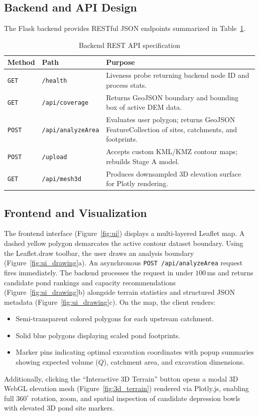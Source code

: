 \documentclass[manuscript,screen,review]{acmart}
\begin{document}
\subsection{Backend and API Design}
The Flask backend provides RESTful JSON endpoints summarized in Table~\ref{tab:api}.
\begin{table}[h]
  \caption{Backend REST API specification}
  \label{tab:api}
  \begin{tabular}{llp{7.5cm}}
    \toprule
    Method & Path & Purpose \\
    \midrule
    \texttt{GET} & \texttt{/health} & Liveness probe returning backend node ID and process stats. \\
    \texttt{GET} & \texttt{/api/coverage} & Returns GeoJSON boundary and bounding box of active DEM data. \\
    \texttt{POST} & \texttt{/api/analyzeArea} & Evaluates user polygon; returns GeoJSON FeatureCollection of sites, catchments, and footprints. \\
    \texttt{POST} & \texttt{/upload} & Accepts custom KML/KMZ contour maps; rebuilds Stage A model. \\
    \texttt{GET} & \texttt{/api/mesh3d} & Produces downsampled 3D elevation surface for Plotly rendering. \\
    \bottomrule
  \end{tabular}
\end{table}

\subsection{Frontend and Visualization}
The frontend interface (Figure~\ref{fig:ui}) displays a multi-layered Leaflet map. A dashed yellow polygon demarcates the active contour dataset boundary. Using the Leaflet.draw toolbar, the user draws an analysis boundary (Figure~\ref{fig:ui_drawing}a). An asynchronous \texttt{POST /api/analyzeArea} request fires immediately. The backend processes the request in under $100$\,ms and returns candidate pond rankings and capacity recommendations (Figure~\ref{fig:ui_drawing}b) alongside terrain statistics and structured JSON metadata (Figure~\ref{fig:ui_drawing}c). On the map, the client renders:
\begin{itemize}
    \item Semi-transparent colored polygons for each upstream catchment.
    \item Solid blue polygons displaying scaled pond footprints.
    \item Marker pins indicating optimal excavation coordinates with popup summaries showing expected volume ($Q$), catchment area, and excavation dimensions.
\end{itemize}
Additionally, clicking the ``Interactive 3D Terrain'' button opens a modal 3D WebGL elevation mesh (Figure~\ref{fig:3d_terrain}) rendered via Plotly.js, enabling full $360^\circ$ rotation, zoom, and spatial inspection of candidate depression bowls with elevated 3D pond site markers.
\end{document}
